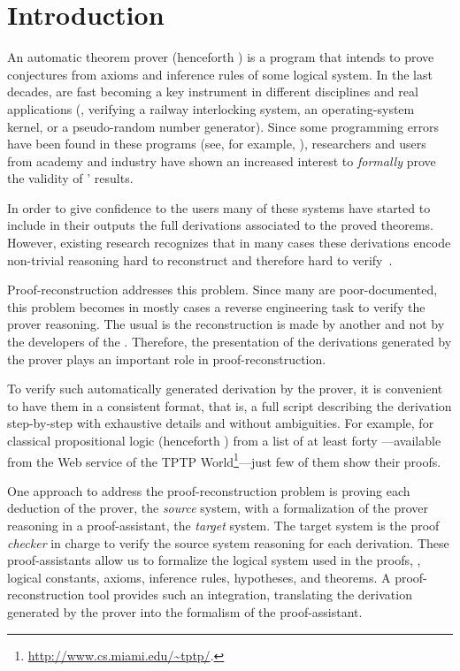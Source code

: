 \documentclass[../main.tex]{subfiles}
\begin{document}

\section{Introduction}
\label{sec:introduction}

An automatic theorem prover (henceforth \ATP) is a program that
intends to prove conjectures from axioms and inference rules of some
logical system. In the last decades, \ATPs are fast becoming a key
instrument in different disciplines and real applications (\eg,
verifying a railway interlocking system, an operating-system kernel,
or a pseudo-random number generator). Since some
programming errors have been found in these programs (see, for
example, \cite{Keller2013,Bohme2011,Fleury2014}), researchers and
users from academy and industry have shown an increased interest to
\emph{formally} prove the validity of \ATPs' results.

In order to give confidence to the \ATP users many of these systems
have started to include in their outputs the full derivations
associated to the proved theorems. However, existing research
recognizes that in many cases these derivations encode non-trivial
reasoning hard to reconstruct and therefore hard to
verify~\cite{paulson2007source,Keller2013}.

Proof-reconstruction addresses this problem. Since many \ATPs are
poor-documented, this problem becomes in mostly cases a reverse
engineering task to verify the prover reasoning. The usual is the
reconstruction is made by another and not by the developers of the
\ATP. Therefore, the presentation of the derivations generated by the
prover plays an important role in proof-reconstruction.

To verify such automatically generated derivation by the prover,
it is convenient to have them in a
consistent format, that is, a full script describing the derivation
step-by-step with  exhaustive details and without ambiguities. For
example, for classical propositional logic (henceforth \CPL) from a
list of at least forty \ATPs---available from the Web service
 of the TPTP World\footnote{\url{http://www.cs.miami.edu/~tptp/}.}---just few of
them show their proofs.

One approach to address the proof-reconstruction problem is
proving each deduction of the prover, the \emph{source} system,
with a formalization of the prover reasoning in a proof-assistant, the \emph{target} system. The target system is the
proof \emph{checker} in charge to verify the source system reasoning
for each derivation.
These proof-assistants allow us to formalize the logical system used
in the proofs, \ie, logical constants, axioms, inference rules,
hypotheses, and theorems.
A proof-reconstruction tool provides such an
integration, translating the derivation generated by the prover into
the formalism of the proof-assistant.
\end{document}

